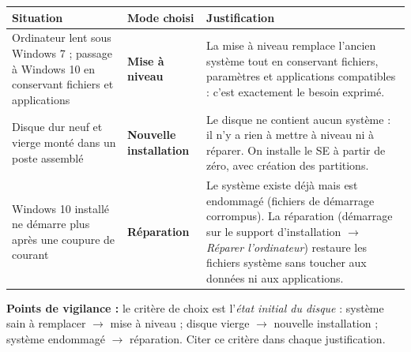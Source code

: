 \documentclass[11pt]{article}
\begin{document}
\begin{corrige}
\begin{center}
\begin{tabularx}{\linewidth}{|X|l|X|}
\hline
\rowcolor{popblueL} \textbf{Situation} & \textbf{Mode choisi} & \textbf{Justification} \\
\hline
Ordinateur lent sous Windows 7 ; passage à Windows 10 en conservant fichiers et applications & \textbf{Mise à niveau} & La mise à niveau remplace l'ancien système tout en conservant fichiers, paramètres et applications compatibles : c'est exactement le besoin exprimé. \\
\hline
Disque dur neuf et vierge monté dans un poste assemblé & \textbf{Nouvelle installation} & Le disque ne contient aucun système : il n'y a rien à mettre à niveau ni à réparer. On installe le SE à partir de zéro, avec création des partitions. \\
\hline
Windows 10 installé ne démarre plus après une coupure de courant & \textbf{Réparation} & Le système existe déjà mais est endommagé (fichiers de démarrage corrompus). La réparation (démarrage sur le support d'installation $\rightarrow$ \emph{Réparer l'ordinateur}) restaure les fichiers système sans toucher aux données ni aux applications. \\
\hline
\end{tabularx}
\end{center}
\textbf{Points de vigilance :} le critère de choix est l'\emph{état initial du disque} : système sain à remplacer $\rightarrow$ mise à niveau ; disque vierge $\rightarrow$ nouvelle installation ; système endommagé $\rightarrow$ réparation. Citer ce critère dans chaque justification.
\end{corrige}
\end{document}
